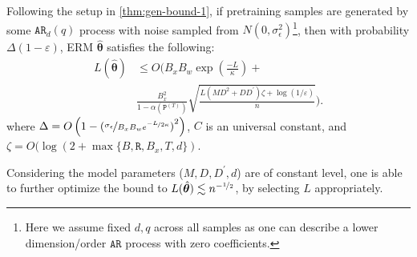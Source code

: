 \begin{corollary}\label{thm:test-error-bound-1}
    Following the setup in \cref{thm:gen-bound-1},
    if pretraining samples are generated by some $\mathtt{AR}_d(q)$ process with noise sampled from $N(0, \sigma^2_\epsilon)$\footnote{Here we assume fixed $d, q$ across all samples as one can describe a lower dimension/order $\mathtt{AR}$ process with zero coefficients.}, 
    then with probability $ \Delta(1 - \varepsilon)$, ERM $\hat{\bm{\theta}}$ satisfies the following:
    \begin{align*}
    L(\hat{\bm{\theta}})
    &
    \leq
    O
    \Bigg(
    B_x B_w \exp \left( \frac{-L}{\kappa} \right)
    +
    \\
    &
    \frac{B_x^2}{1 - \alpha(\mathtt{P}^{(T)})}
    \sqrt{ \frac{L(MD^2 + D D^\prime ) \zeta + \log (1 / \varepsilon)}{n} }
    \Bigg).
    \end{align*}
    where $\Delta = O\left(1 - \left(  \nicefrac{\sigma_\epsilon}{B_x  B_w e^{\nicefrac{-L}{2\kappa}}}  \right)^2  \right)$, $C$ is an universal constant, and $\zeta = O(\log(2 + \max \{ B, \mathtt{R}, B_x, T, d \})$. 
\end{corollary}
\begin{remark}
Considering the model parameters ($M,D,D^\prime, d$) are of constant level, one is able to further optimize the bound to
$L(\hat{\bm{\theta}}) \lesssim  n^{-\nicefrac{1}{2}}$, by selecting $L$ appropriately.    
\end{remark}



